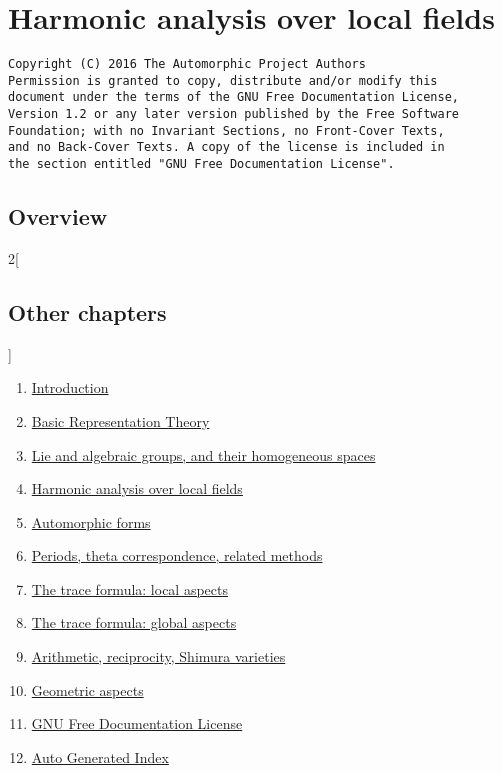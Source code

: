 \documentclass[oneside]{stacks-project-book}
\theoremstyle{plain}
\theoremstyle{definition}
\theoremstyle{remark}
\numberwithin{equation}{subsection}
\begin{document}
%

\chapter{Harmonic analysis over local fields}



\label{harmonicanalysis-section-phantom}
\hypertarget{0300}{}
\reversemarginpar{}

\begin{verbatim}
Copyright (C) 2016 The Automorphic Project Authors
Permission is granted to copy, distribute and/or modify this
document under the terms of the GNU Free Documentation License,
Version 1.2 or any later version published by the Free Software
Foundation; with no Invariant Sections, no Front-Cover Texts,
and no Back-Cover Texts. A copy of the license is included in
the section entitled "GNU Free Documentation License".
\end{verbatim}



\section{Overview}
\label{harmonicanalysis-section-overview}
\hypertarget{0301}{}
\reversemarginpar{}




\begin{multicols}{2}[\section{Other chapters}]
\noindent
\begin{enumerate}
\item \hyperref[introduction-section-phantom]{Introduction}
\item \hyperref[representationtheory-section-phantom]{Basic Representation Theory}
\item \hyperref[algebraicgroups-section-phantom]{Lie and algebraic groups, and their homogeneous spaces}
\item \hyperref[harmonicanalysis-section-phantom]{Harmonic analysis over local fields}
\item \hyperref[automorphicforms-section-phantom]{Automorphic forms}
\item \hyperref[periods-section-phantom]{Periods, theta correspondence, related methods}
\item \hyperref[traceformulalocal-section-phantom]{The trace formula: local aspects}
\item \hyperref[traceformulaglobal-section-phantom]{The trace formula: global aspects}
\item \hyperref[arithmetic-section-phantom]{Arithmetic, reciprocity, Shimura varieties}
\item \hyperref[geometric-section-phantom]{Geometric aspects}
\item \hyperref[fdl-section-phantom]{GNU Free Documentation License}
\item \hyperref[index-section-phantom]{Auto Generated Index}
\end{enumerate}
\end{multicols}
\end{document}
